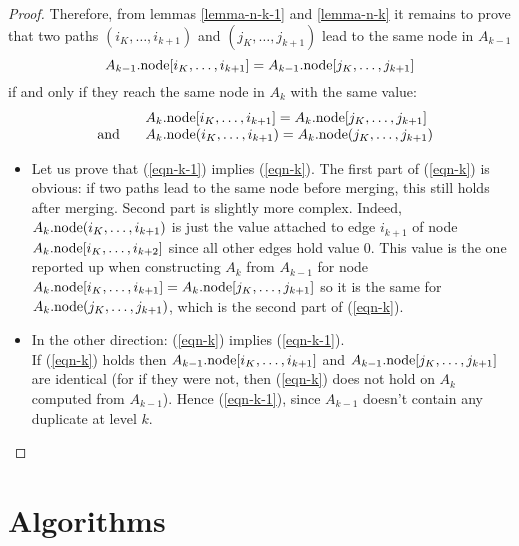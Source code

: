 \documentclass[a4paper]{easychair}
\newcommand{\m}{\mbox}
\newcommand{\node}[1]{#1{\rm .node}}
\begin{document}
{\begin{appendix}
\begin{proof}
Therefore, from lemmas \ref{lemma-n-k-1} and \ref{lemma-n-k} it remains to prove 
that two paths $(i_K, \ldots, i_{k+1})$ and $(j_K, \ldots, j_{k+1})$ lead to 
the same node in $A_{k-1}$
\begin{equation}
\label{eqn-k-1}
\node{A_{k-1}}[i_K, \ldots, i_{k+1}] = \node{A_{k-1}}[j_K, \ldots, j_{k+1}]
\end{equation}
if and only if they reach the same node in $A_k$ with the same value:
\begin{equation}
\label{eqn-k}
\begin{array}{ll}
&\node{A_k}[i_K, \ldots, i_{k+1}] = \node{A_k}[j_K, \ldots, j_{k+1}]\\
\;\;\;\m{and}\;\;\;&
\node{A_k}(i_K, \ldots, i_{k+1}) = \node{A_k}(j_K, \ldots, j_{k+1})
\end{array}
\end{equation}

\begin{itemize}

\item Let us prove that (\ref{eqn-k-1}) implies (\ref{eqn-k}).
The first part of (\ref{eqn-k}) is obvious: if two paths lead to the same node before
merging, this still holds after merging. Second part is slightly more complex.
Indeed, $\node{A_k}(i_K, \ldots, i_{k+1})$ is just the value attached to edge $i_{k+1}$ of node
$\node{A_k}[i_K, \ldots, i_{k+2}]$ since all other edges hold value $0$. This value
is the one reported up when constructing $A_k$ from $A_{k-1}$ for 
node $\node{A_k}[i_K, \ldots, i_{k+1}] = \node{A_k}[j_K, \ldots, j_{k+1}]$ so it is the
same for $\node{A_k}(j_K, \ldots, j_{k+1})$, which is the second part of (\ref{eqn-k}).

\item In the other direction: (\ref{eqn-k}) implies (\ref{eqn-k-1}). \\
If (\ref{eqn-k}) holds then $\node{A_{k-1}}[i_K, \ldots, i_{k+1}]$ and
$\node{A_{k-1}}[j_K,\ldots, j_{k+1}]$ are identical (for if they were not, then (\ref{eqn-k})
does not hold on $A_k$ computed from $A_{k-1}$). Hence (\ref{eqn-k-1}), since
$A_{k-1}$ doesn't contain any duplicate at level $k$.

\end{itemize}
\end{proof}

\section{Algorithms}


\end{appendix}}
\end{document}
